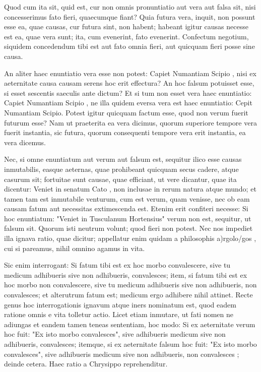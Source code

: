  Quod cum ita sit, quid est, cur non omnis pronuntiatio aut vera aut falsa sit, nisi concesserimus fato fieri, quaecumque fiant? Quia futura vera, inquit, non possunt esse ea, quae causas, cur futura sint, non habent; habeant igitur causas necesse est ea, quae vera sunt; ita, cum evenerint, fato evenerint. Confectum negotium, siquidem concedendum tibi est aut fato omnia fieri, aut quicquam fieri posse sine causa.

 An aliter haec enuntiatio vera esse non potest: Capiet Numantiam Scipio , nisi ex aeternitate causa causam serens hoc erit effectura? An hoc falsum potuisset esse, si esset sescentis saeculis ante dictum? Et si tum non esset vera haec enuntiatio: Capiet Numantiam Scipio , ne illa quidem eversa vera est haec enuntiatio: Cepit Numantiam Scipio. Potest igitur quicquam factum esse, quod non verum fuerit futurum esse? Nam ut praeterita ea vera dicimus, quorum superiore tempore vera fuerit instantia, sic futura, quorum consequenti tempore vera erit instantia, ea vera dicemus.

 Nec, si omne enuntiatum aut verum aut falsum est, sequitur ilico esse causas inmutabilis, easque aeternas, quae prohibeant quicquam secus cadere, atque casurum sit; fortuitae sunt causae, quae efficiant, ut vere dicantur, quae ita dicentur: Veniet in senatum Cato , non inclusae in rerum natura atque mundo; et tamen tam est inmutabile venturum, cum est verum, quam venisse, nec ob eam causam fatum aut necessitas extimescenda est. Etenim erit confiteri necesse: Si hoc enuntiatum: "Veniet in Tusculanum Hortensius" verum non est, sequitur, ut falsum sit. Quorum isti neutrum volunt; quod fieri non potest. Nec nos impediet illa ignava ratio, quae dicitur; appellatur enim quidam a philosophis a)rgo\s lo/gos , cui si pareamus, nihil omnino agamus in vita.

 Sic enim interrogant: Si fatum tibi est ex hoc morbo convalescere, sive tu medicum adhibueris sive non adhibueris, convalesces; item, si fatum tibi est ex hoc morbo non convalescere, sive tu medicum adhibueris sive non adhibueris, non convalesces; et alterutrum fatum est; medicum ergo adhibere nihil attinet. Recte genus hoc interrogationis ignavum atque iners nominatum est, quod eadem ratione omnis e vita tolletur actio. Licet etiam inmutare, ut fati nomen ne adiungas et eandem tamen teneas sententiam, hoc modo: Si ex aeternitate verum hoc fuit: "Ex isto morbo convalesces", sive adhibueris medicum sive non adhibueris, convalesces; itemque, si ex aeternitate falsum hoc fuit: "Ex isto morbo convalesces", sive adhibueris medicum sive non adhibueris, non convalesces ; deinde cetera. Haec ratio a Chrysippo reprehenditur.

